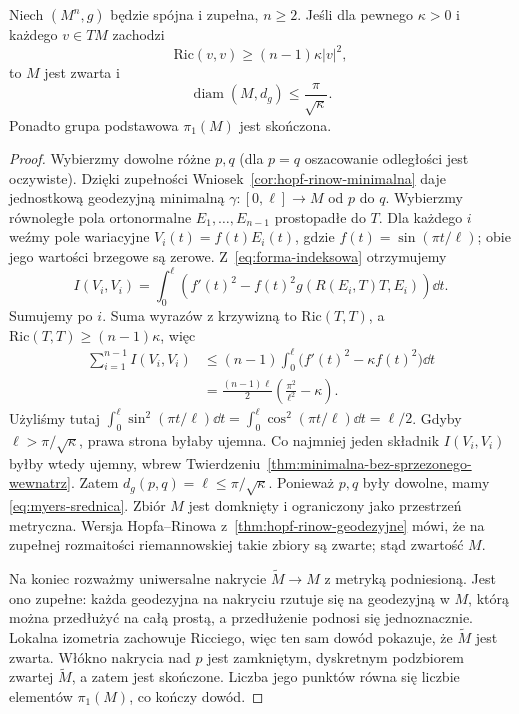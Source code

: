\begin{twierdzenie}
\label{thm:bonnet-myers}
Niech $(M^n,g)$ będzie spójna i zupełna, $n\geq2$.
Jeśli dla pewnego $\kappa>0$ i każdego
$v\in TM$ zachodzi
\begin{equation}\label{eq:myers-ricci-warunek}
 \mathrm{Ric}(v,v)\geq(n-1)\kappa|v|^2,
\end{equation}
to $M$ jest zwarta i
\begin{equation}\label{eq:myers-srednica}
 \operatorname{diam}(M,d_g)
 \leq\frac{\pi}{\sqrt\kappa}.
\end{equation}
Ponadto grupa podstawowa $\pi_1(M)$ jest skończona.
\end{twierdzenie}
\begin{proof}
Wybierzmy dowolne różne $p,q$ (dla $p=q$ oszacowanie
odległości jest oczywiste). Dzięki zupełności
Wniosek~\ref{cor:hopf-rinow-minimalna}
daje jednostkową geodezyjną minimalną
$\gamma:[0,\ell]\to M$ od $p$ do $q$.
Wybierzmy równoległe pola ortonormalne
$E_1,\ldots,E_{n-1}$ prostopadłe do $T$.
Dla każdego $i$ weźmy pole wariacyjne
$V_i(t)=f(t)E_i(t)$, gdzie
$f(t)=\sin(\pi t/\ell)$; obie jego wartości
brzegowe są zerowe. Z~\eqref{eq:forma-indeksowa}
otrzymujemy
\[
 I(V_i,V_i)=\int_0^\ell
 \left(f'(t)^2-f(t)^2g(R(E_i,T)T,E_i)\right)\dd t.
\]
Sumujemy po $i$. Suma wyrazów z krzywizną
to $\mathrm{Ric}(T,T)$, a
$\mathrm{Ric}(T,T)\geq(n-1)\kappa$, więc
\begin{align*}
 \sum_{i=1}^{n-1}I(V_i,V_i)
 &\leq(n-1)\int_0^\ell
     \bigl(f'(t)^2-\kappa f(t)^2\bigr)\dd t\\
 &=\frac{(n-1)\ell}{2}
           \left(\frac{\pi^2}{\ell^2}-\kappa\right).
\end{align*}
Użyliśmy tutaj
$\int_0^\ell\sin^2(\pi t/\ell)\dd t
=\int_0^\ell\cos^2(\pi t/\ell)\dd t=\ell/2$.
Gdyby $\ell>\pi/\sqrt\kappa$, prawa strona
byłaby ujemna. Co najmniej jeden składnik
$I(V_i,V_i)$ byłby wtedy ujemny, wbrew
Twierdzeniu~\ref{thm:minimalna-bez-sprzezonego-wewnatrz}.
Zatem $d_g(p,q)=\ell\leq\pi/\sqrt\kappa$.
Ponieważ $p,q$ były dowolne, mamy
\eqref{eq:myers-srednica}. Zbiór $M$ jest
domknięty i ograniczony jako przestrzeń
metryczna. Wersja Hopfa--Rinowa
z~\ref{thm:hopf-rinow-geodezyjne} mówi,
że na zupełnej rozmaitości riemannowskiej
takie zbiory są zwarte; stąd zwartość $M$.

Na koniec rozważmy uniwersalne nakrycie
$\widetilde M\to M$ z metryką podniesioną.
Jest ono zupełne: każda geodezyjna na nakryciu
rzutuje się na geodezyjną w $M$, którą można
przedłużyć na całą prostą, a przedłużenie
podnosi się jednoznacznie. Lokalna izometria
zachowuje Ricciego, więc ten sam dowód pokazuje,
że $\widetilde M$ jest zwarta. Włókno nakrycia
nad $p$ jest zamkniętym, dyskretnym podzbiorem
zwartej $\widetilde M$, a zatem jest skończone.
Liczba jego punktów równa się liczbie elementów
$\pi_1(M)$, co kończy dowód.
\end{proof}

